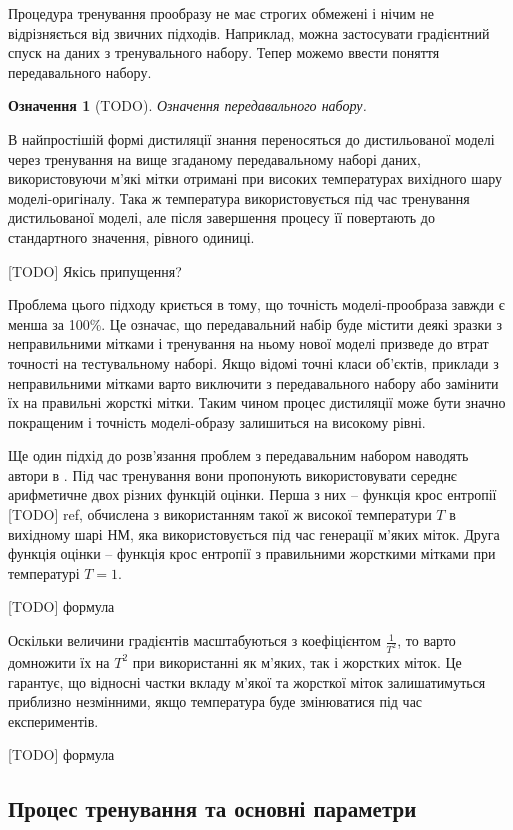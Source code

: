 \documentclass[14pt,a4paper]{extarticle}
\newcounter{e}
\newtheorem{defn}[theorem]{Означення}
\numberwithin{equation}{section}
\numberwithin{figure}{section}
\begin{document}
 Процедура тренування прообразу не має строгих обмежені і нічим не відрізняється від звичних підходів. Наприклад, можна застосувати градієнтний спуск на даних з тренувального набору. Тепер можемо ввести поняття передавального набору.
 
 \begin{defn}
 	[TODO] Означення передавального набору.
 \end{defn}
 
 
 В найпростішій формі дистиляції знання переносяться до дистильованої моделі через тренування на вище згаданому передавальному наборі даних, використовуючи м'які мітки отримані при високих температурах вихідного шару моделі-оригіналу. Така ж температура використовується під час тренування дистильованої моделі, але після завершення процесу її повертають до стандартного значення, рівного одиниці.
 
 [TODO] Якісь припущення?
 
 Проблема цього підходу криється в тому, що точність моделі-прообраза завжди є менша за 100\%. Це означає, що передавальний набір буде містити деякі зразки з неправильними мітками і тренування на ньому нової моделі призведе до втрат точності на тестувальному наборі. Якщо відомі точні класи об'єктів, приклади з неправильними мітками варто виключити з передавального набору або замінити їх на правильні жорсткі мітки. Таким чином процес дистиляції може бути значно покращеним і точність моделі-образу залишиться на високому рівні.
 
 Ще один підхід до розв'язання проблем з передавальним набором наводять автори в \cite{distillation}. Під час тренування вони пропонують використовувати середнє арифметичне двох різних функцій оцінки. Перша з них -- функція крос ентропії [TODO] ref, обчислена з використанням такої ж високої температури $T$ в вихідному шарі НМ, яка використовується під час генерації м'яких міток. Друга функція оцінки -- функція крос ентропії з правильними жорсткими мітками при температурі $T=1$.
 
 [TODO] формула
 
 Оскільки величини градієнтів масштабуються з коефіцієнтом $\frac{1}{T^2}$, то варто домножити їх на $T^2$ при використанні як м'яких, так і жорстких міток. Це гарантує, що відносні частки вкладу м'якої та жорсткої міток залишатимуться приблизно незмінними, якщо температура буде змінюватися під час експериментів.
 
 [TODO] формула
 
 \subsection{Процес тренування та основні параметри} 
 
\end{document}
